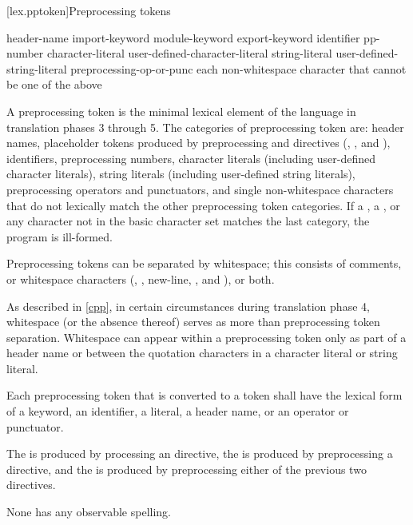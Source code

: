 [lex.pptoken]{Preprocessing tokens}

%
\begin{bnf}
\br
    header-name\br
    import-keyword\br
    module-keyword\br
    export-keyword\br
    identifier\br
    pp-number\br
    character-literal\br
    user-defined-character-literal\br
    string-literal\br
    user-defined-string-literal\br
    preprocessing-op-or-punc\br
    \textnormal{each non-whitespace character that cannot be one of the above}
\end{bnf}

\pnum
A preprocessing token is the minimal lexical element of the language in translation
phases 3 through 5.
The categories of preprocessing token are: header names,
placeholder tokens produced by preprocessing  and  directives
(, , and ),
identifiers, preprocessing numbers, character literals (including user-defined character
literals), string literals (including user-defined string literals), preprocessing
operators and punctuators, and single non-whitespace characters that do not lexically
match the other preprocessing token categories.
If a , a ,
or any character not in the basic character set
matches the last category, the program is ill-formed.

\pnum
Preprocessing tokens can be separated by
%
whitespace;
%
this consists of comments, or whitespace characters
(,
,
new-line,
, and
), or both.
\begin{note}
As described in \ref{cpp}, in certain
circumstances during translation phase 4, whitespace (or the absence
thereof) serves as more than preprocessing token separation. Whitespace
can appear within a preprocessing token only as part of a header name or
between the quotation characters in a character literal or
string literal.
\end{note}

\pnum
Each preprocessing token that is converted to a token
shall have the lexical form of a keyword, an identifier, a literal,
a header name,
or an operator or punctuator.

\pnum
{}%
%
%
The  is produced
by processing an  directive,
the  is produced
by preprocessing a  directive, and
the  is produced
by preprocessing either of the previous two directives.
\begin{note}
None has any observable spelling.
\end{note}

